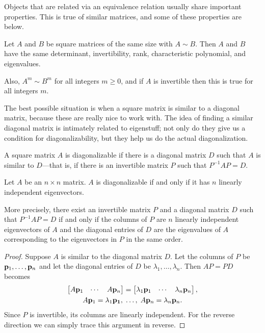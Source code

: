 \documentclass[../m073main.tex]{subfiles}
\begin{document}
Objects that are related via an equivalence relation usually share important properties.
This is true of similar matrices, and some of these properties are below.

\begin{theorem}
	Let $A$ and $B$ be square matrices of the same size with $A \sim B$.
	Then $A$ and $B$ have the same determinant, invertibility, rank, characteristic polynomial, and eigenvalues.

	Also, $A^m \sim B^m$ for all integers $m \geq 0$, and if $A$ is invertible then this is true for all integers $m$.
\end{theorem}

The best possible situation is when a square matrix is similar to a diagonal matrix, because these are really nice to work with.
The idea of finding a similar diagonal matrix is intimately related to eigenstuff; not only do they give us a condition for diagonalizability, but they help us do the actual diagonalization.

\begin{definition}
	A square matrix $A$ is diagonalizable if there is a diagonal matrix $D$ such that $A$ is similar to $D$---that is, if there is an invertible matrix $P$ such that $P^{-1}AP = D$.
\end{definition}


\begin{theorem}
	Let $A$ be an $n \times n$ matrix.
	$A$ is diagonalizable if and only if it has $n$ linearly independent eigenvectors.

	More precisely, there exist an invertible matrix $P$ and a diagonal matrix $D$ such that $P^{-1}AP = D$ if and only if the columns of $P$ are $n$ linearly independent eigenvectors of $A$ and the diagonal entries of $D$ are the eigenvalues of $A$ corresponding to the eigenvectors in $P$ in the same order.
\end{theorem}

\begin{proof}
	Suppose $A$ is similar to the diagonal matrix $D$.
	Let the columns of $P$ be $\mathbf{p}_1, \ldots, \mathbf{p}_n$ and let the diagonal entries of $D$ be $\lambda_1, \ldots, \lambda_n$.
	Then $AP = PD$ becomes
	\begin{gather*}
		\begin{bmatrix} A\mathbf{p}_1 & \cdots & A\mathbf{p}_n \end{bmatrix} = \begin{bmatrix} \lambda_1 \mathbf{p}_1 & \cdots & \lambda_n \mathbf{p}_n \end{bmatrix}, \\
		A\mathbf{p}_1 = \lambda_1 \mathbf{p_1}, \; \ldots, \; A\mathbf{p}_n = \lambda_n \mathbf{p}_n.
	\end{gather*}
	Since $P$ is invertible, its columns are linearly independent.
	For the reverse direction we can simply trace this argument in reverse.
\end{proof}
\end{document}
